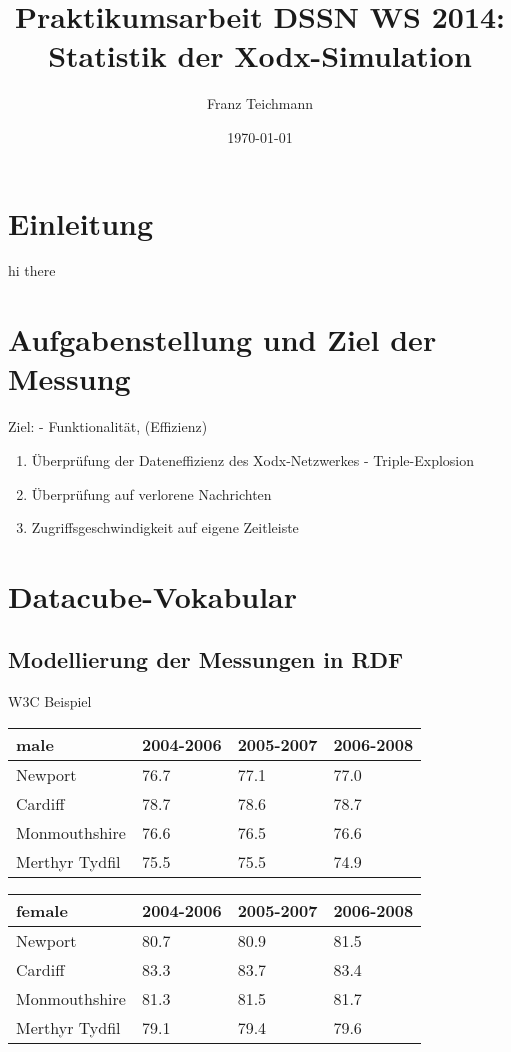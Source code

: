 \documentclass{article}
\title{Praktikumsarbeit DSSN WS 2014: \\ Statistik der Xodx-Simulation}
\author{Franz Teichmann}
\date{\today}
\begin{document}
\maketitle

\tableofcontents
\newpage

\section{Einleitung}
hi there

\section{Aufgabenstellung und Ziel der Messung}

Ziel: - Funktionalität, (Effizienz)
\begin{enumerate}
    \item{Überprüfung der Dateneffizienz des Xodx-Netzwerkes - Triple-Explosion}
    \item{Überprüfung auf verlorene Nachrichten}
    \item{Zugriffsgeschwindigkeit auf eigene Zeitleiste}
\end{enumerate}


\section{Datacube-Vokabular}

\subsection{Modellierung der Messungen in RDF}

W3C Beispiel

\begin{table}[h]
\begin{tabular}{|l|l|l|l|}
\hline
male           & 2004-2006 & 2005-2007 & 2006-2008 \\ \hline
Newport        & 76.7      & 77.1      & 77.0      \\ \hline
Cardiff        & 78.7      & 78.6      & 78.7      \\ \hline
Monmouthshire  & 76.6      & 76.5      & 76.6      \\ \hline
Merthyr Tydfil & 75.5      & 75.5      & 74.9      \\ \hline
\end{tabular}
\end{table}

\begin{table}[h]
\begin{tabular}{|l|l|l|l|}
\hline
female         & 2004-2006 & 2005-2007 & 2006-2008 \\ \hline
Newport        & 80.7      & 80.9      & 81.5      \\ \hline
Cardiff        & 83.3      & 83.7      & 83.4      \\ \hline
Monmouthshire  & 81.3      & 81.5      & 81.7      \\ \hline
Merthyr Tydfil & 79.1      & 79.4      & 79.6      \\ \hline
\end{tabular}
\end{table}
\end{document}
